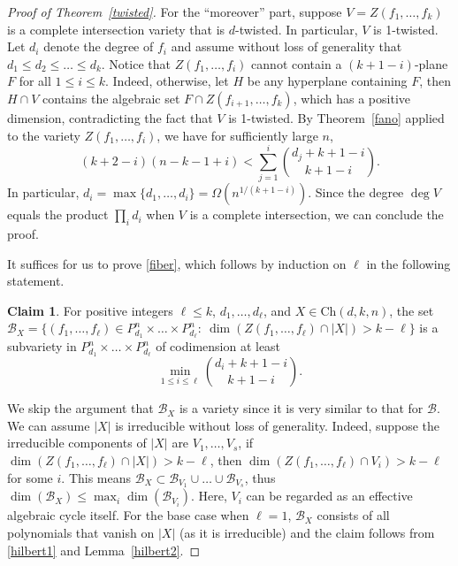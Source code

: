 \documentclass[11pt]{article}
\theoremstyle{definition}
\newtheorem{claim}[theorem]{Claim}
\begin{document}
\begin{proof}[Proof of Theorem~\ref{twisted}]
    For the ``moreover'' part, suppose $V = Z(f_1,\dots,f_k)$ is a complete intersection variety that is $d$-twisted. In particular, $V$ is 1-twisted. Let $d_i$ denote the degree of $f_i$ and assume without loss of generality that $d_1 \leq d_2 \leq \dots \leq d_k$. Notice that $Z(f_1,\dots,f_i)$ cannot contain a $(k+1-i)$-plane $F$ for all $1\leq i\leq k$. Indeed, otherwise, let $H$ be any hyperplane containing $F$, then $H\cap V$ contains the algebraic set $F \cap Z(f_{i+1},\dots,f_k)$, which has a positive dimension, contradicting the fact that $V$ is 1-twisted. By Theorem~\ref{fano} applied to the variety $Z(f_1,\dots,f_i)$, we have for sufficiently large $n$, \begin{equation*}
        (k+2-i)(n-k-1+i) <\sum_{j=1}^i \binom{d_j+k+1-i}{k+1-i}.
    \end{equation*} In particular, $d_i=\max\{d_1,\dots,d_i\} = \Omega\left(n^{1/(k+1-i)}\right)$. Since the degree $\deg V$ equals the product $\prod_i d_i$ when $V$ is a complete intersection, we can conclude the proof.

    It suffices for us to prove \eqref{fiber}, which follows by induction on $\ell$ in the following statement.
    \begin{claim}
    For positive integers $\ell \leq k$, $d_1,\dots,d_\ell$, and $X \in \text{Ch}(d,k,n)$, the set $\mathcal{B}_X = \{ (f_1,\dots,f_\ell)\in P^{n}_{d_1}\times\dots\times P^n_{d_\ell} :~ \dim ( Z(f_1,\dots,f_\ell) \cap |X| )> k -\ell \}$ is a subvariety in $P^{n}_{d_1}\times\dots\times P^n_{d_\ell}$ of codimension at least \begin{equation*}
        \min_{1\leq i\leq \ell} \binom{d_i+k+1-i}{k+1-i}.
    \end{equation*}
    \end{claim}
    
    We skip the argument that $\mathcal{B}_X$ is a variety since it is very similar to that for $\mathcal{B}$. We can assume $|X|$ is irreducible without loss of generality. Indeed, suppose the irreducible components of $|X|$ are $V_1,\dots, V_s$, if $\dim( Z(f_1,\ldots,f_\ell) \cap |X|)> k-\ell$, then $\dim( Z(f_1,\ldots,f_\ell) \cap V_i)>k-\ell$ for some $i$. This means $\mathcal{B}_X \subset \mathcal{B}_{V_1}\cup\dots\cup \mathcal{B}_{V_s}$, thus $\dim (\mathcal{B}_X)  \leq \max_i \dim \left(\mathcal{B}_{V_i}\right)$. Here, $V_i$ can be regarded as an effective algebraic cycle itself. For the base case when $\ell = 1$, $\mathcal{B}_X$ consists of all polynomials that vanish on $|X|$ (as it is irreducible) and the claim follows from \eqref{hilbert1} and Lemma~\ref{hilbert2}.
        

\end{proof}
\end{document}
